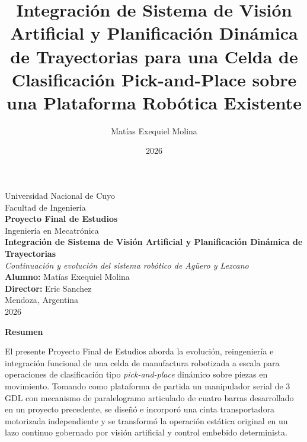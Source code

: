 \documentclass[12pt, a4paper]{report}
\title{Integración de Sistema de Visión Artificial y Planificación Dinámica de Trayectorias para una Celda de Clasificación Pick-and-Place sobre una Plataforma Robótica Existente}
\author{Matías Exequiel Molina}
\date{2026}
\begin{document}
\begin{titlepage}
    \centering
    \vspace*{1cm}
    \Large Universidad Nacional de Cuyo \\
    \large Facultad de Ingeniería \\
    \vspace{1cm}
    \Huge \textbf{Proyecto Final de Estudios} \\
    \vspace{0.5cm}
    \large Ingeniería en Mecatrónica \\
    \vspace{2cm}
    \Huge \textbf{Integración de Sistema de Visión Artificial y Planificación Dinámica de Trayectorias} \\
    \vspace{1cm}
    \large \textit{Continuación y evolución del sistema robótico de Agüero y Lezcano} \\
    \vspace{2cm}
    \textbf{Alumno:} Matías Exequiel Molina \\
    \textbf{Director:} Eric Sanchez \\
    \vspace{2cm}
    Mendoza, Argentina \\
    2026
\end{titlepage}

\newpage
\thispagestyle{plain}
\begin{center}
    \vspace*{0.5cm}
    {\Large \textbf{Resumen}}
    \vspace{0.8cm}
\end{center}

El presente Proyecto Final de Estudios aborda la evolución, reingeniería e integración funcional de una celda de manufactura robotizada a escala para operaciones de clasificación tipo \textit{pick-and-place} dinámico sobre piezas en movimiento. Tomando como plataforma de partida un manipulador serial de 3 GDL con mecanismo de paralelogramo articulado de cuatro barras desarrollado en un proyecto precedente, se diseñó e incorporó una cinta transportadora motorizada independiente y se transformó la operación estática original en un lazo continuo gobernado por visión artificial y control embebido determinista.
\end{document}
